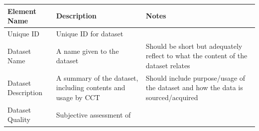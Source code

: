 \documentclass[
]{WileySix}
\begin{document}
\begin{longtable}[]{@{}lll@{}}
\toprule
\begin{minipage}[b]{0.22\columnwidth}\raggedright
Element Name\strut
\end{minipage} & \begin{minipage}[b]{0.35\columnwidth}\raggedright
Description\strut
\end{minipage} & \begin{minipage}[b]{0.35\columnwidth}\raggedright
Notes\strut
\end{minipage}\tabularnewline
\midrule
\endhead
\begin{minipage}[t]{0.22\columnwidth}\raggedright
Unique ID\strut
\end{minipage} & \begin{minipage}[t]{0.35\columnwidth}\raggedright
Unique ID for dataset\strut
\end{minipage} & \begin{minipage}[t]{0.35\columnwidth}\raggedright
\strut
\end{minipage}\tabularnewline
\begin{minipage}[t]{0.22\columnwidth}\raggedright
Dataset Name\strut
\end{minipage} & \begin{minipage}[t]{0.35\columnwidth}\raggedright
A name given to the
dataset\strut
\end{minipage} & \begin{minipage}[t]{0.35\columnwidth}\raggedright
Should be short but
adequately reflect to
what the content of the
dataset relates\strut
\end{minipage}\tabularnewline
\begin{minipage}[t]{0.22\columnwidth}\raggedright
Dataset
Description\strut
\end{minipage} & \begin{minipage}[t]{0.35\columnwidth}\raggedright
A summary of the dataset,
including contents and
usage by CCT\strut
\end{minipage} & \begin{minipage}[t]{0.35\columnwidth}\raggedright
Should include
purpose/usage of the
dataset and how the data
is sourced/acquired\strut
\end{minipage}\tabularnewline
\begin{minipage}[t]{0.22\columnwidth}\raggedright
Dataset Quality\strut
\end{minipage} & \begin{minipage}[t]{0.35\columnwidth}\raggedright
Subjective assessment of

\end{minipage}
\end{longtable}
\end{document}
